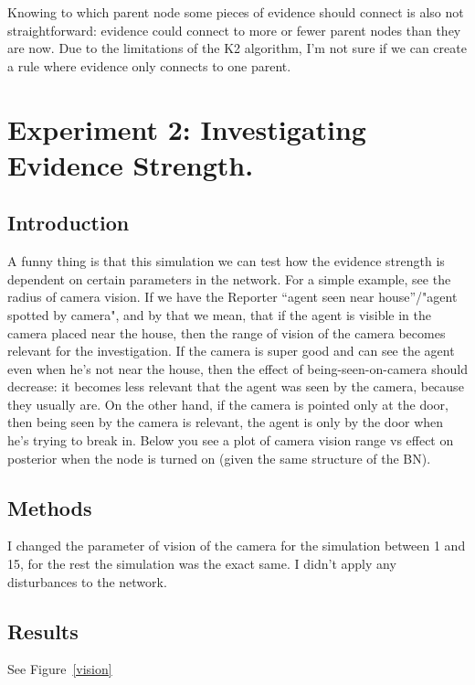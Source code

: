 Knowing to which parent node some pieces of evidence should connect is also not straightforward: evidence could connect to more or fewer parent nodes than they are now. Due to the limitations of the K2 algorithm, I'm not sure if we can create a rule where evidence only connects to one parent.





\section{Experiment 2: Investigating Evidence Strength.}


\subsection{Introduction}
A funny thing is that this simulation we can test how the evidence strength is dependent on certain parameters in the network. For a simple example, see the radius of camera vision. If we have the Reporter ``agent seen near house''/"agent spotted by camera", and by that we mean, that if the agent is visible in the camera placed near the house, then the range of vision of the camera becomes relevant for the investigation. If the camera is super good and can see the agent even when he's not near the house, then the effect of being-seen-on-camera should decrease: it becomes less relevant that the agent was seen by the camera, because they usually are. On the other hand, if the camera is pointed only at the door, then being seen by the camera is relevant, the agent is only by the door when he's trying to break in. Below you see a plot of camera vision range vs effect on posterior when the node is turned on (given the same structure of the BN).

\subsection{Methods}
I changed the parameter of vision of the camera for the simulation between 1 and 15, for the rest the simulation was the exact same. I didn't apply any disturbances to the network.

\subsection{Results}

See Figure~\ref{vision}

